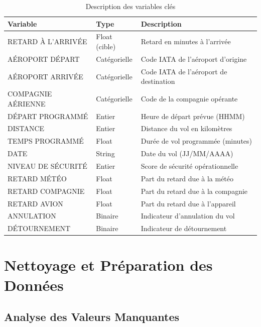 \documentclass[12pt,a4paper]{article}
\begin{document}
\begin{table}[H]
  \centering
  \caption{Description des variables clés}
  \small
  \begin{tabular}{p{4.5cm}p{3cm}p{6cm}}
    \toprule
    \textbf{Variable} & \textbf{Type} & \textbf{Description} \\
    \midrule
    RETARD À L'ARRIVÉE & Float (cible) & Retard en minutes à l'arrivée \\
    AÉROPORT DÉPART & Catégorielle & Code IATA de l'aéroport d'origine \\
    AÉROPORT ARRIVÉE & Catégorielle & Code IATA de l'aéroport de destination \\
    COMPAGNIE AÉRIENNE & Catégorielle & Code de la compagnie opérante \\
    DÉPART PROGRAMMÉ & Entier & Heure de départ prévue (HHMM) \\
    DISTANCE & Entier & Distance du vol en kilomètres \\
    TEMPS PROGRAMMÉ & Float & Durée de vol programmée (minutes) \\
    DATE & String & Date du vol (JJ/MM/AAAA) \\
    NIVEAU DE SÉCURITÉ & Entier & Score de sécurité opérationnelle \\
    RETARD MÉTÉO & Float & Part du retard due à la météo \\
    RETARD COMPAGNIE & Float & Part du retard due à la compagnie \\
    RETARD AVION & Float & Part du retard due à l'appareil \\
    ANNULATION & Binaire & Indicateur d'annulation du vol \\
    DÉTOURNEMENT & Binaire & Indicateur de détournement \\
    \bottomrule
  \end{tabular}
\end{table}

\newpage
\section{Nettoyage et Préparation des Données}

\subsection{Analyse des Valeurs Manquantes}
\end{document}
